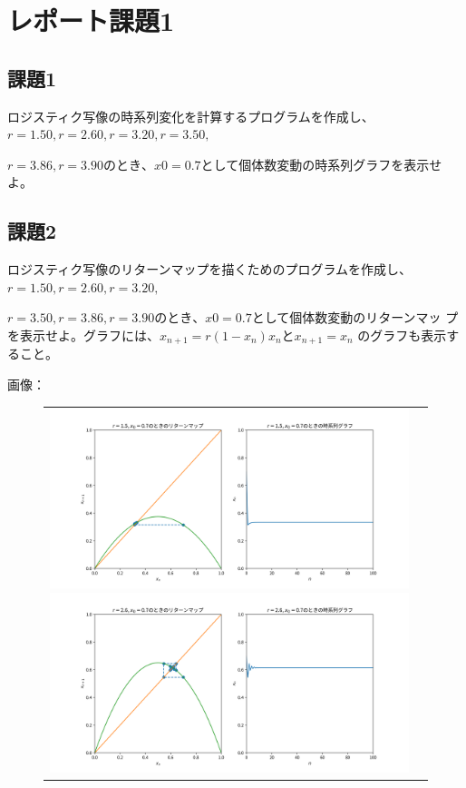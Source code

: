\section{レポート課題1}
\subsection{課題1}
ロジスティク写像の時系列変化を計算するプログラムを作成し、$r = 1.50, r = 2.60,r = 3.20, r = 3.50,$ \par
$r = 3.86, r = 3.90 のとき、x0 = 0.7$として個体数変動の時系列グラフを表示せよ。\par

\subsection{課題2}
ロジスティク写像のリターンマップを描くためのプログラムを作成し、$r = 1.50, r = 2.60, r = 3.20,$ \par
$r = 3.50, r = 3.86, r = 3.90 のとき、x0 = 0.7$として個体数変動のリターンマッ
プを表示せよ。グラフには、$x_{n+1} = r(1 −x_n)x_n とx_{n+1} = x_n$ のグラフも表示すること。\par
画像：
\begin{figure}[htbp]
  \begin{tabular}{cc}
    \begin{minipage}[t]{0.45\hsize}
      \centering
      \includegraphics[keepaspectratio, scale=0.25]{images/ctest2_1.png}
    \end{minipage}

    \begin{minipage}[t]{0.45\hsize}
      \centering
      \includegraphics[keepaspectratio, scale=0.25]{images/ctest2_2.png}
    \end{minipage}
  \end{tabular}
\end{figure}

